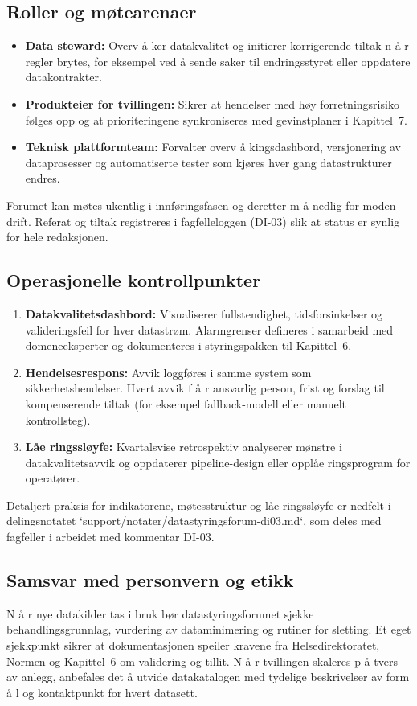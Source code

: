 \subsection{Roller og møtearenaer}
\begin{itemize}
    \item \textbf{Data steward:} Overv å ker datakvalitet og initierer korrigerende tiltak n å r regler brytes, for eksempel ved  å sende saker til endringsstyret eller oppdatere datakontrakter.
    \item \textbf{Produkteier for tvillingen:} Sikrer at hendelser med høy forretningsrisiko følges opp og at prioriteringene synkroniseres med gevinstplaner i Kapittel~7.
    \item \textbf{Teknisk plattformteam:} Forvalter overv å kingsdashbord, versjonering av dataprosesser og automatiserte tester som kjøres hver gang datastrukturer endres.
\end{itemize}
Forumet kan møtes ukentlig i innføringsfasen og deretter m å nedlig for moden drift. Referat og tiltak registreres i fagfelleloggen (DI-03) slik at status er synlig for hele redaksjonen.

\subsection{Operasjonelle kontrollpunkter}
\begin{enumerate}
    \item \textbf{Datakvalitetsdashbord:} Visualiserer fullstendighet, tidsforsinkelser og valideringsfeil for hver datastrøm. Alarmgrenser defineres i samarbeid med domeneeksperter og dokumenteres i styringspakken til Kapittel~6.
    \item \textbf{Hendelsesrespons:} Avvik loggføres i samme system som sikkerhetshendelser. Hvert avvik f å r ansvarlig person, frist og forslag til kompenserende tiltak (for eksempel fallback-modell eller manuelt kontrollsteg).
    \item \textbf{Låe ringssløyfe:} Kvartalsvise retrospektiv analyserer mønstre i datakvalitetsavvik og oppdaterer pipeline-design eller opplåe ringsprogram for operatører.
\end{enumerate}
Detaljert praksis for indikatorene, møtesstruktur og låe ringssløyfe er nedfelt i delingsnotatet `support/notater/datastyringsforum-di03.md`,
som deles med fagfeller i arbeidet med kommentar DI-03.

\subsection{Samsvar med personvern og etikk}
N å r nye datakilder tas i bruk bør datastyringsforumet sjekke behandlingsgrunnlag, vurdering av dataminimering og rutiner for sletting. Et eget sjekkpunkt sikrer at dokumentasjonen speiler kravene fra Helsedirektoratet, Normen og Kapittel~6 om validering og tillit. N å r tvillingen skaleres p å tvers av anlegg, anbefales det  å utvide datakatalogen med tydelige beskrivelser av form å l og kontaktpunkt for hvert datasett.

